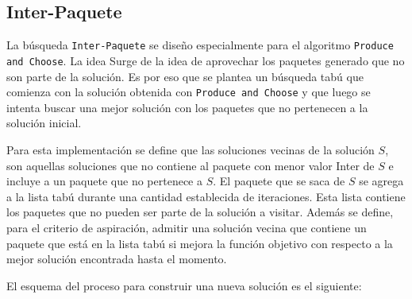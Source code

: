 \subsection{Inter-Paquete}
La búsqueda \texttt{Inter-Paquete} se diseño especialmente para el algoritmo \texttt{Produce and Choose}. La idea Surge de la idea de aprovechar los paquetes generado que no son parte de la solución. Es por eso que se plantea un búsqueda tabú que comienza con la solución obtenida con \texttt{Produce and Choose} y que luego se intenta buscar una mejor solución con los paquetes que no pertenecen a la solución inicial. 

Para esta implementación se define que las soluciones vecinas de la solución $S$, son aquellas soluciones que no contiene al paquete con menor valor Inter de $S$ e incluye a un paquete que no pertenece a $S$. El paquete que se saca de $S$ se agrega a la lista tabú durante una cantidad establecida de iteraciones. Esta lista contiene los paquetes que no pueden ser parte de la solución a visitar. Además se define, para el criterio de aspiración, admitir una solución vecina que contiene un paquete que está en la lista tabú si mejora la función objetivo con respecto a la mejor solución encontrada hasta el momento. 

El esquema del proceso para construir una nueva soluci\'on es el siguiente:


